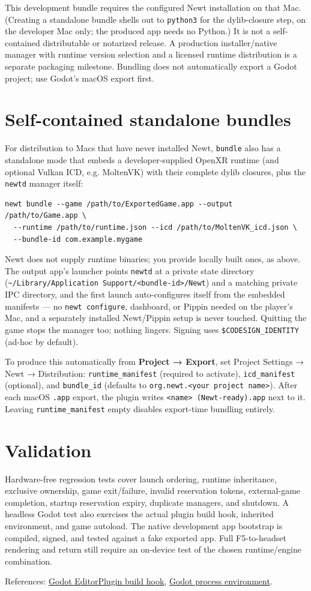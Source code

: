 \documentclass[11pt]{article}
\begin{document}
This development bundle requires the configured Newt installation on that Mac. (Creating a standalone bundle shells out to \texttt{python3} for the dylib-closure step, on the developer Mac only; the produced app needs no Python.) It is not a self-contained distributable or notarized release. A production installer/native manager with runtime version selection and a licensed runtime distribution is a separate packaging milestone. Bundling does not automatically export a Godot project; use Godot's macOS export first.
\section{Self-contained standalone bundles}
\label{sec:org646a444}
For distribution to Macs that have never installed Newt, \texttt{bundle} also has a standalone mode that embeds a developer-supplied OpenXR runtime (and optional Vulkan ICD, e.g. MoltenVK) with their complete dylib closures, plus the \texttt{newtd} manager itself:
\begin{verbatim}
newt bundle --game /path/to/ExportedGame.app --output /path/to/Game.app \
  --runtime /path/to/runtime.json --icd /path/to/MoltenVK_icd.json \
  --bundle-id com.example.mygame
\end{verbatim}
Newt does not supply runtime binaries; you provide locally built ones, as above. The output app's launcher points \texttt{newtd} at a private state directory (\texttt{\textasciitilde{}/Library/Application Support/<bundle-id>/Newt}) and a matching private IPC directory, and the first launch auto-configures itself from the embedded manifests — no \texttt{newt configure}, dashboard, or Pippin needed on the player's Mac, and a separately installed Newt/Pippin setup is never touched. Quitting the game stops the manager too; nothing lingers. Signing uses \texttt{\$CODESIGN\_IDENTITY} (ad-hoc by default).

To produce this automatically from \textbf{Project → Export}, set Project Settings → Newt → Distribution: \texttt{runtime\_manifest} (required to activate), \texttt{icd\_manifest} (optional), and \texttt{bundle\_id} (defaults to \texttt{org.newt.<your project name>}). After each macOS \texttt{.app} export, the plugin writes \texttt{<name> (Newt-ready).app} next to it. Leaving \texttt{runtime\_manifest} empty disables export-time bundling entirely.
\section{Validation}
\label{sec:orgb80ff1a}
Hardware-free regression tests cover launch ordering, runtime inheritance, exclusive ownership, game exit/failure, invalid reservation tokens, external-game completion, startup reservation expiry, duplicate managers, and shutdown. A headless Godot test also exercises the actual plugin build hook, inherited environment, and game autoload. The native development app bootstrap is compiled, signed, and tested against a fake exported app. Full F5-to-headset rendering and return still require an on-device test of the chosen runtime/engine combination.

References: \href{https://docs.godotengine.org/en/4.4/classes/class\_editorplugin.html\#class-editorplugin-private-method-build}{Godot EditorPlugin build hook}, \href{https://docs.godotengine.org/en/4.4/classes/class\_os.html\#class-os-method-set-environment}{Godot process environment}.
\end{document}
